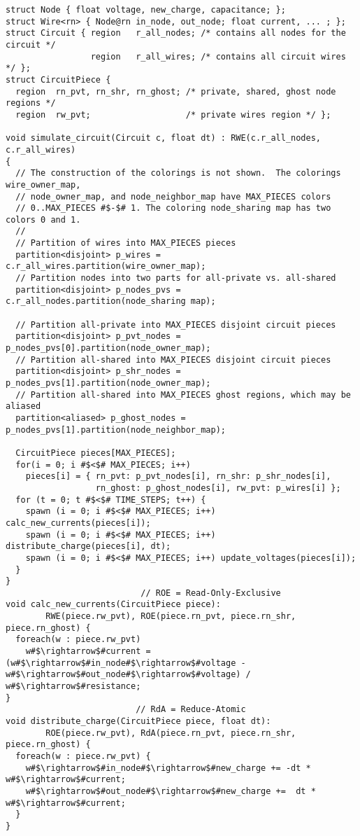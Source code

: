 \begin{lstlisting}[float={t},label={lst:code_ex},caption={Circuit simulation.}]
struct Node { float voltage, new_charge, capacitance; };
struct Wire<rn> { Node@rn in_node, out_node; float current, ... ; };
struct Circuit { region   r_all_nodes; /* contains all nodes for the circuit */
                 region   r_all_wires; /* contains all circuit wires */ };
struct CircuitPiece {
  region  rn_pvt, rn_shr, rn_ghost; /* private, shared, ghost node regions */
  region  rw_pvt;                   /* private wires region */ };

void simulate_circuit(Circuit c, float dt) : RWE(c.r_all_nodes, c.r_all_wires)
{
  // The construction of the colorings is not shown.  The colorings wire_owner_map,
  // node_owner_map, and node_neighbor_map have MAX_PIECES colors 
  // 0..MAX_PIECES #$-$# 1. The coloring node_sharing map has two colors 0 and 1.
  //
  // Partition of wires into MAX_PIECES pieces
  partition<disjoint> p_wires = c.r_all_wires.partition(wire_owner_map); 
  // Partition nodes into two parts for all-private vs. all-shared
  partition<disjoint> p_nodes_pvs = c.r_all_nodes.partition(node_sharing map);

  // Partition all-private into MAX_PIECES disjoint circuit pieces
  partition<disjoint> p_pvt_nodes = p_nodes_pvs[0].partition(node_owner_map);
  // Partition all-shared into MAX_PIECES disjoint circuit pieces
  partition<disjoint> p_shr_nodes = p_nodes_pvs[1].partition(node_owner_map);
  // Partition all-shared into MAX_PIECES ghost regions, which may be aliased
  partition<aliased> p_ghost_nodes = p_nodes_pvs[1].partition(node_neighbor_map);

  CircuitPiece pieces[MAX_PIECES];
  for(i = 0; i #$<$# MAX_PIECES; i++) 
    pieces[i] = { rn_pvt: p_pvt_nodes[i], rn_shr: p_shr_nodes[i],
                  rn_ghost: p_ghost_nodes[i], rw_pvt: p_wires[i] };
  for (t = 0; t #$<$# TIME_STEPS; t++) {
    spawn (i = 0; i #$<$# MAX_PIECES; i++) calc_new_currents(pieces[i]);
    spawn (i = 0; i #$<$# MAX_PIECES; i++) distribute_charge(pieces[i], dt);
    spawn (i = 0; i #$<$# MAX_PIECES; i++) update_voltages(pieces[i]);
  }
}
                           // ROE = Read-Only-Exclusive
void calc_new_currents(CircuitPiece piece):
        RWE(piece.rw_pvt), ROE(piece.rn_pvt, piece.rn_shr, piece.rn_ghost) {
  foreach(w : piece.rw_pvt)
    w#$\rightarrow$#current = (w#$\rightarrow$#in_node#$\rightarrow$#voltage - w#$\rightarrow$#out_node#$\rightarrow$#voltage) / w#$\rightarrow$#resistance;
}
                          // RdA = Reduce-Atomic
void distribute_charge(CircuitPiece piece, float dt):
        ROE(piece.rw_pvt), RdA(piece.rn_pvt, piece.rn_shr, piece.rn_ghost) {
  foreach(w : piece.rw_pvt) {
    w#$\rightarrow$#in_node#$\rightarrow$#new_charge += -dt * w#$\rightarrow$#current;
    w#$\rightarrow$#out_node#$\rightarrow$#new_charge +=  dt * w#$\rightarrow$#current;
  }
}


\end{lstlisting}
